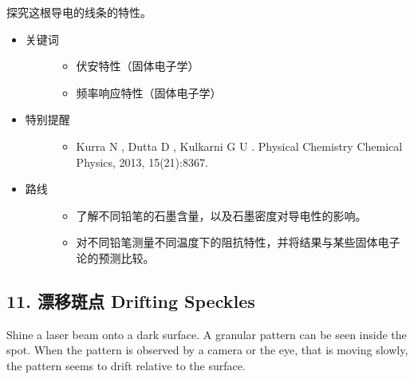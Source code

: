 \documentclass[a4paper,10pt,english]{sphinxmanual}
\begin{document}
探究这根导电的线条的特性。
\begin{itemize}
\item {} \begin{description}
\item[{关键词}] \leavevmode\begin{itemize}
\item {} 
伏安特性（固体电子学）

\item {} 
频率响应特性（固体电子学）

\end{itemize}

\end{description}

\item {} \begin{description}
\item[{特别提醒}] \leavevmode\begin{itemize}
\item {} 
Kurra N , Dutta D , Kulkarni G U .  Physical Chemistry Chemical Physics, 2013, 15(21):8367.

\end{itemize}

\end{description}

\item {} \begin{description}
\item[{路线}] \leavevmode\begin{itemize}
\item {} 
了解不同铅笔的石墨含量，以及石墨密度对导电性的影响。

\item {} 
对不同铅笔测量不同温度下的阻抗特性，并将结果与某些固体电子论的预测比较。

\end{itemize}

\end{description}

\end{itemize}


\subsection{11. 漂移斑点 Drifting Speckles}
\label{\detokenize{8. Appendix:drifting-speckles}}
Shine a laser beam onto a dark surface. A granular pattern can be seen inside the spot. When the pattern is observed by a camera or the eye, that is moving slowly, the pattern seems to drift relative to the surface.
\end{document}
